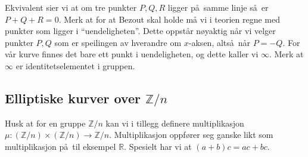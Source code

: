\begin{figure}[htb]
    \centering
\end{figure}

Ekvivalent sier vi at om tre punkter $P,Q,R$ ligger på samme linje
så er $P + Q + R = 0$.
Merk at for at Bezout skal holde må vi i teorien regne med punkter som ligger
i ``uendeligheten''.
Dette oppstår nøyaktig når vi velger punkter $P,Q$ som er speilingen
av hverandre om $x$-aksen,
altså når $P = -Q$.
For vår kurve finnes det bare ett punkt i uendeligheten, og dette kaller vi $\infty$.
Merk at $\infty$ er identitetselementet i gruppen.

\subsection{Elliptiske kurver over $\mathbb Z / n$}

Husk at for en gruppe $\mathbb Z / n$ kan vi i tillegg definere
multiplikasjon $\mu\colon (\mathbb Z / n)\times (\mathbb Z / n)\to \mathbb Z / n$.
Multiplikasjon oppfører seg ganske likt som multiplikasjon på til eksempel
$\mathbb R$.
Spesielt har vi at $(a + b)c = ac + bc$.


